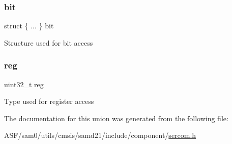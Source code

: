 \subsubsection{\texorpdfstring{bit}{bit}}
{\footnotesize\ttfamily struct \{ ... \}   bit}

Structure used for bit access \mbox{\label{union_s_e_r_c_o_m___s_p_i___a_d_d_r___type_a6b91636401516a477989a336376d7b40}} 
\subsubsection{\texorpdfstring{reg}{reg}}
{\footnotesize\ttfamily uint32\+\_\+t reg}

Type used for register access 

The documentation for this union was generated from the following file\+:\begin{DoxyCompactItemize}
\item 
A\+S\+F/sam0/utils/cmsis/samd21/include/component/\mbox{\hyperlink{utils_2cmsis_2samd21_2include_2component_2sercom_8h}{sercom.\+h}}\end{DoxyCompactItemize}
